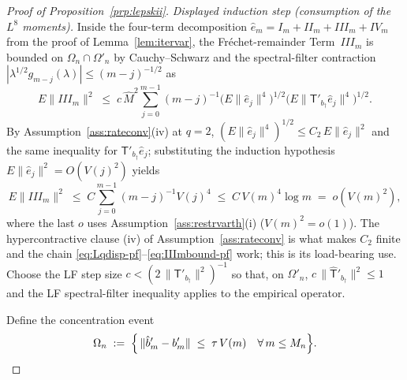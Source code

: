 \begin{proof}[Proof of Proposition~\ref{prp:lepskii}]
\emph{Displayed induction step (consumption of the $L^8$ moments).}
Inside the four-term decomposition
$\hat e_m = I_m + II_m + III_m + IV_m$ from the proof of
Lemma~\ref{lem:itervar}, the Fr\'echet-remainder Term~$III_m$ is
bounded on $\Omega_n \cap \Omega'_n$ by Cauchy--Schwarz and the
spectral-filter contraction
$|\lambda^{1/2}g_{m-j}(\lambda)| \le (m-j)^{-1/2}$ as
\begin{equation}\label{eq:Lqdisp-pf}
E\|III_m\|^2 \;\le\; c\,\hat M^{2}\sum_{j=0}^{m-1}(m-j)^{-1}
\bigl(E\|\hat e_j\|^{4}\bigr)^{1/2}
\bigl(E\|\mathsf T'_{b_\dagger}\hat e_j\|^{4}\bigr)^{1/2}.
\end{equation}
By Assumption~\ref{ass:rateconv}\textup{(iv)} at $q = 2$,
$(E\|\hat e_j\|^{4})^{1/2} \le C_2\,E\|\hat e_j\|^{2}$ and the same
inequality for $\mathsf T'_{b_\dagger}\hat e_j$; substituting the
induction hypothesis $E\|\hat e_j\|^2 = O(V(j)^2)$ yields
\begin{equation}\label{eq:IIImbound-pf}
E\|III_m\|^2 \;\le\; C\sum_{j=0}^{m-1}(m-j)^{-1}V(j)^{4}
\;\le\; C\,V(m)^{4}\log m
\;=\; o(V(m)^{2}),
\end{equation}
where the last $o$ uses Assumption~\ref{ass:restrvarth}\textup{(i)}
($V(m)^2 = o(1)$). The hypercontractive clause
\textup{(iv)} of Assumption~\ref{ass:rateconv} is what makes $C_2$
finite and the chain
\eqref{eq:Lqdisp-pf}--\eqref{eq:IIImbound-pf} work; this is its
load-bearing use.
Choose the LF step size $c < (2\,\|\mathsf T'_{b_\dagger}\|^2)^{-1}$ so that,
on $\Omega'_n$, $c\,\|\hat{\mathsf T}'_{b_\dagger}\|^2 \le 1$ and the LF
spectral-filter inequality applies to the empirical operator.

Define the concentration event %
\begin{equation}\label{eq:Omegan-pf}
\Omega_n \;:=\; \Bigl\{\,\|\hat b'_m - b'_m\| \;\le\; \tau\,V(m)\quad
\forall\, m \le M_n\Bigr\}.
\end{equation}


\end{proof}
